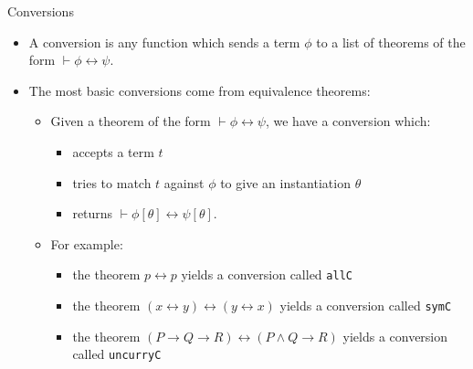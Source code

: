 \documentclass[presentation]{beamer}
\begin{document}
\begin{frame}[fragile,label={sec:orgheadline26}]{Conversions}
 \begin{itemize}
\item A conversion is any function which sends a term \(\phi\) to a list of theorems of the
form \(\vdash \phi \leftrightarrow \psi\).

\item The most basic conversions come from equivalence theorems:
\begin{itemize}
\item Given a theorem of the form \(\vdash \phi \leftrightarrow \psi\), we have a
conversion which:
\begin{itemize}
\item accepts a term \(t\)
\item tries to match \(t\) against \(\phi\) to give an instantiation \(\theta\)
\item returns \(\vdash \phi[\theta] \leftrightarrow \psi[\theta]\).
\end{itemize}
\item For example:
\begin{itemize}
\item the theorem \(p \leftrightarrow p\) yields a conversion called \texttt{allC}
\item the theorem \((x \leftrightarrow y) \leftrightarrow (y \leftrightarrow x)\)
      yields a conversion called \texttt{symC}
\item the theorem \((P \rightarrow Q \rightarrow R) \leftrightarrow (P \wedge Q
      \rightarrow R)\) yields a conversion called \texttt{uncurryC}
\end{itemize}
\end{itemize}
\end{itemize}
\end{frame}
\end{document}
